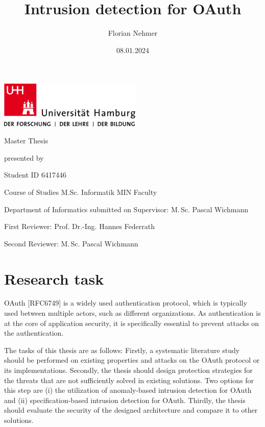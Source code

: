 \documentclass[
    fontsize=12pt,
    headings=small,
    parskip=half,           %
    bibliography=totoc,
    numbers=noenddot,       %
    open=any,               %
	final                   %
    ]{scrreprt}
\title{Intrusion detection for OAuth}
\author{Florian Nehmer}
\date{08.01.2024} %
\begin{document}
\begin{titlepage}%
	\includegraphics[width=6.8cm]{./pic/up-uhh-logo-u-2010-u-farbe-u-rgb.pdf}
	\begin{center}\Large
		\vfill
		Master Thesis
		\vfill
		\makeatletter
		{\Large\textsf{\textbf{\@title}}\par}
		\makeatother
		\vfill
		presented by
		\par\bigskip
		\makeatletter
		{\@author} \par
		\makeatother
		Student ID 6417446 \par
		Course of Studies M.Sc. Informatik
		\vfill
		MIN Faculty \par
		Department of Informatics
		\vfill
		\makeatletter
		submitted on {\@date}
		\makeatother
		\vfill
		Supervisor: M.\,Sc. Pascal Wichmann \par
		First Reviewer: Prof. Dr.-Ing. Hannes Federrath \par
		Second Reviewer: M.\,Sc. Pascal Wichmann
	\end{center}
\end{titlepage}%

\chapter*{Research task}
OAuth [RFC6749] is a widely used authentication protocol, which is typically used between multiple actors, such as different organizations. As authentication is at the core of application security, it is specifically essential to prevent attacks on the authentication.

The tasks of this thesis are as follows: Firstly, a systematic literature study should be performed on existing properties and attacks on the OAuth protocol or its implementations. Secondly, the thesis should design protection strategies for the threats that are not sufficiently solved in existing solutions. Two options for this step are (i) the utilization of anomaly-based intrusion detection for OAuth and (ii) specification-based intrusion detection for OAuth. Thirdly, the thesis should evaluate the security of the designed architecture and compare it to other solutions.
\end{document}
